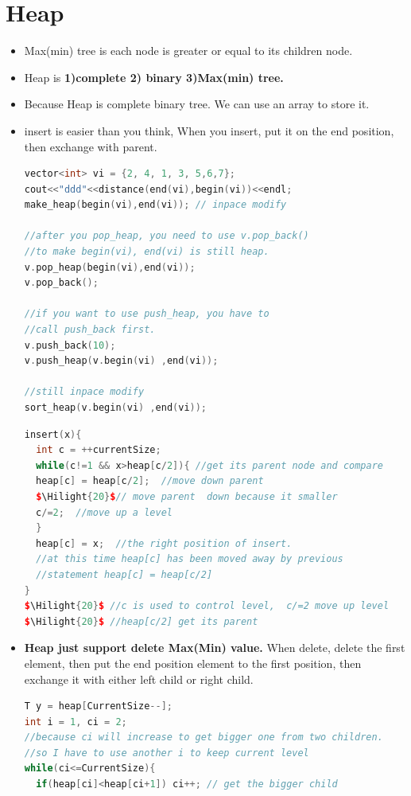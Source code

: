\documentclass[a4paper,12pt,twoside]{book}
\newcommand{\Hilight}[1]{\makebox[0pt][l]{\color{yellow}\rule[-3pt]{#1em}{11pt}}}
\begin{document}
\section{Heap}

\begin{itemize}
\item Max(min) tree is each node is greater or equal to its children node.
\item Heap is \textbf{1)complete 2) binary 3)Max(min) tree.}
\item Because Heap is complete binary tree. We can use an array to store it. 
\item insert is easier than you think, When you insert, put it on the end position, then exchange with parent.  


\begin{lstlisting}[frame=single, language=c++, mathescape=true]
vector<int> vi = {2, 4, 1, 3, 5,6,7};
cout<<"ddd"<<distance(end(vi),begin(vi))<<endl;
make_heap(begin(vi),end(vi)); // inpace modify

//after you pop_heap, you need to use v.pop_back()
//to make begin(vi), end(vi) is still heap. 
v.pop_heap(begin(vi),end(vi));
v.pop_back();

//if you want to use push_heap, you have to 
//call push_back first. 
v.push_back(10);
v.push_heap(v.begin(vi) ,end(vi));

//still inpace modify
sort_heap(v.begin(vi) ,end(vi));
\end{lstlisting}



\begin{lstlisting}[frame=single, language=c++, mathescape=true]
insert(x){
  int c = ++currentSize;
  while(c!=1 && x>heap[c/2]){ //get its parent node and compare
  heap[c] = heap[c/2];  //move down parent
  $\Hilight{20}$// move parent  down because it smaller
  c/=2;  //move up a level 
  }  
  heap[c] = x;  //the right position of insert. 
  //at this time heap[c] has been moved away by previous 
  //statement heap[c] = heap[c/2] 
}
$\Hilight{20}$ //c is used to control level,  c/=2 move up level
$\Hilight{20}$ //heap[c/2] get its parent
\end{lstlisting}

\item \textbf{Heap just support delete Max(Min) value.} When delete, delete the first element, then put the end position element to the first position, then exchange it with either left child or right child. 
\begin{lstlisting}[frame=single, language=c++, mathescape=true]
T y = heap[CurrentSize--];
int i = 1, ci = 2;
//because ci will increase to get bigger one from two children.
//so I have to use another i to keep current level
while(ci<=CurrentSize){
  if(heap[ci]<heap[ci+1]) ci++; // get the bigger child
  

\end{lstlisting}
\end{itemize}
\end{document}

